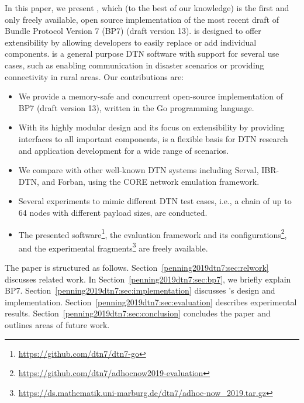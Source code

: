 In this paper, we present \dtn, which (to the best of our knowledge) is the first and only freely available, open source implementation of the most recent draft of Bundle Protocol Version 7 (BP7) (draft version 13).
\dtn is designed to offer extensibility by allowing developers to easily replace or add individual components. 
\dtn is a general purpose DTN software with support for several use cases, such as enabling communication in disaster scenarios or providing connectivity in rural areas. 
Our contributions are:
\begin{itemize}
    \item We provide a memory-safe and concurrent open-source implementation of BP7 (draft version 13), written in the Go programming language.
    \item With its highly modular design and its focus on extensibility by providing interfaces to all important components, \dtn is a flexible basis for DTN research and application development for a wide range of scenarios.
    \item We compare \dtn with other well-known DTN systems including Serval, IBR-DTN, and Forban, using the CORE network emulation framework.
    \item Several experiments to mimic different DTN test cases, i.e., a chain of up to 64 nodes with different payload sizes,
    are conducted.
    \item The presented \dtn 
    software\footnote{\url{https://github.com/dtn7/dtn7-go}},
    the evaluation framework and its 
    configurations\footnote{\url{https://github.com/dtn7/adhocnow2019-evaluation}},
    and the experimental 
    fragments\footnote{\url{https://ds.mathematik.uni-marburg.de/dtn7/adhoc-now_2019.tar.gz}}
    are freely available.
\end{itemize}

The paper is structured as follows. Section~\ref{penning2019dtn7:sec:relwork} discusses related work. 
In Section~\ref{penning2019dtn7:sec:bp7}, we briefly explain BP7. Section~\ref{penning2019dtn7:sec:implementation} discusses \dtn's design and implementation.
Section~\ref{penning2019dtn7:sec:evaluation} describes experimental results. Section~\ref{penning2019dtn7:sec:conclusion} concludes the paper and outlines areas of future work.
